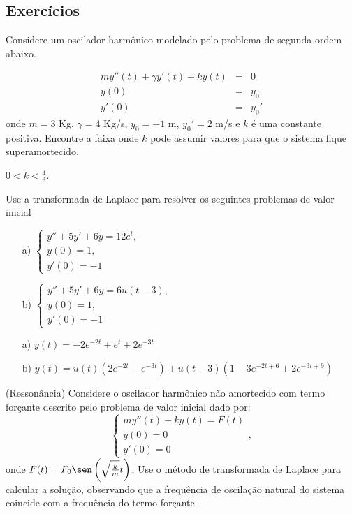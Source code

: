 \subsection*{Exercícios}
\begin{exer}
Considere um oscilador harmônico modelado pelo problema de segunda ordem abaixo.

 \begin{eqnarray*}
my''(t)+\gamma y'(t)+ky(t)&=&0\\
y(0)&=&y_0\\
y'(0)&=&y_0'
\end{eqnarray*}
onde $m=3\!$ Kg, $\gamma=4\!$ Kg/s, $y_0=-1\!$ m, $y_0'=2\!$ m/s e $k$ é uma constante positiva. Encontre a faixa onde $k$ pode assumir valores para que o sistema fique superamortecido.
\end{exer}
\begin{resp}
 $0<k<\frac{4}{3}$.
\end{resp}
\begin{exer}Use a transformada de Laplace para resolver os seguintes problemas de valor inicial
\begin{itemize}
 \item[a)] $\displaystyle\left\{ \begin{array}{l}y''+5y'+6y=12e^t,\\ y(0)=1,\\y'(0)=-1 \end{array}\right.$
 \item[b)] $\displaystyle\left\{ \begin{array}{l}y''+5y'+6y=6u(t-3),\\ y(0)=1,\\y'(0)=-1 \end{array}\right.$
\end{itemize}
\end{exer}
\begin{resp}
\begin{itemize}
 \item[a)] $y(t)=-2e^{-2t}+e^{t}+2e^{-3t}$
 \item[b)] $y(t)=u(t)\left(2e^{-2t}-e^{-3t}\right)+u(t-3)\left(1-3e^{-2t+6}+2e^{-3t+9}\right)$
\end{itemize}
\end{resp}
\begin{exer}(Ressonância) Considere o oscilador harmônico não amortecido com termo forçante descrito pelo problema de valor inicial dado por:
\begin{equation}\left\{
\begin{array}{l}
 my''(t)+ky(t)=F(t)\\
 y(0)=0\\
 y'(0)=0
\end{array}
\right.,
\end{equation}
onde $F(t)=F_0\sen\left(\sqrt{\frac{k}{m}}t\right)$.
Use o método de transformada de Laplace para calcular a solução, observando que a frequência de oscilação natural do sistema coincide com a frequência do termo forçante.
\end{exer}
